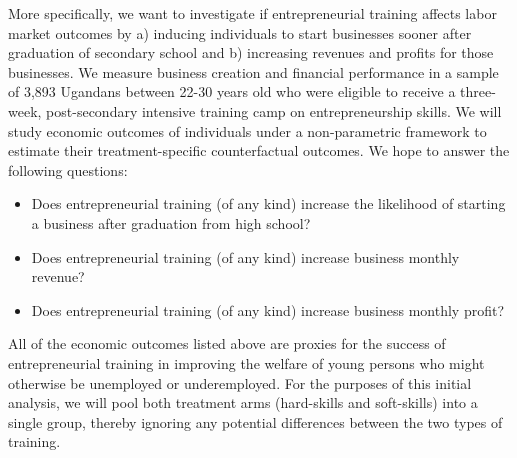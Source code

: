More specifically, we want to investigate if entrepreneurial training affects labor market outcomes by a) inducing individuals to start businesses sooner after graduation of secondary school and b) increasing revenues and profits for those businesses. We measure business creation and financial performance in a sample of 3,893 Ugandans between 22-30 years old who were eligible to receive a three-week, post-secondary intensive training camp on entrepreneurship skills. We will study economic outcomes of individuals under a non-parametric framework to estimate their treatment-specific counterfactual outcomes. We hope to answer the following questions:\\

\begin{itemize}
\item Does entrepreneurial training (of any kind) increase the likelihood of starting a business after graduation from high school?
\item Does entrepreneurial training (of any kind) increase business monthly revenue?
\item Does entrepreneurial training (of any kind) increase business monthly profit?
\end{itemize}

All of the economic outcomes listed above are proxies for the success of entrepreneurial training in improving the welfare of young persons who might otherwise be unemployed or underemployed. For the purposes of this initial analysis, we will pool both treatment arms (hard-skills and soft-skills) into a single group, thereby ignoring any potential differences between the two types of training.\\


